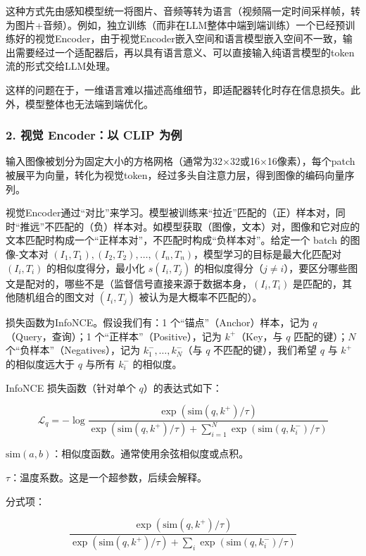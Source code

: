 这种方式先由感知模型统一将图片、音频等转为语言（视频隔一定时间采样帧，转为图片+音频）。例如，独立训练（而非在LLM整体中端到端训练）一个已经预训练好的视觉Encoder，由于视觉Encoder嵌入空间和语言模型嵌入空间不一致，输出需要经过一个适配器后，再以具有语言意义、可以直接输入纯语言模型的token流的形式交给LLM处理。

这样的问题在于，一维语言难以描述高维细节，即适配器转化时存在信息损失。此外，模型整体也无法端到端优化。

\hypertarget{ux89c6ux89c9-encoderux4ee5-clip-ux4e3aux4f8b}{%
\subsubsection{2. 视觉 Encoder：以 CLIP 为例}\label{ux89c6ux89c9-encoderux4ee5-clip-ux4e3aux4f8b}}

输入图像被划分为固定大小的方格网格（通常为32×32或16×16像素），每个patch被展平为向量，转化为视觉token，经过多头自注意力层，得到图像的编码向量序列。

视觉Encoder通过``对比''来学习。模型被训练来``拉近''匹配的（正）样本对，同时``推远''不匹配的（负）样本对。如模型获取（图像，文本）对，图像和它对应的文本匹配时构成一个``正样本对''，不匹配时构成``负样本对''。给定一个 batch 的图像-文本对 \((I_1,T_1),(I_2,T_2),\ldots,(I_n,T_n)\)，模型学习的目标是最大化匹配对 \((I_i,T_i)\) 的相似度得分，最小化 \(s(I_i,T_j)\) 的相似度得分（\(j\ne i\)），要区分哪些图文是配对的，哪些不是（监督信号直接来源于数据本身，\((I_i,T_i)\) 是匹配的，其他随机组合的图文对 \((I_i,T_j)\) 被认为是大概率不匹配的）。

损失函数为InfoNCE。假设我们有：1 个``锚点''（Anchor）样本，记为 \(q\)（Query，查询）；1 个``正样本''（Positive），记为 \(k^+\)（Key，与 \(q\) 匹配的键）；\(N\) 个``负样本''（Negatives），记为 \(k_1^-,\ldots,k_N^-\)（与 \(q\) 不匹配的键），我们希望 \(q\) 与 \(k^+\) 的相似度远大于 \(q\) 与所有 \(k_i^-\) 的相似度。

InfoNCE 损失函数（针对单个 \(q\)）的表达式如下：

\[
\mathcal{L}_q=-\log \frac{\exp(\mathrm{sim}(q,k^+)/\tau)}
{\exp(\mathrm{sim}(q,k^+)/\tau)+\sum_{i=1}^{N}\exp(\mathrm{sim}(q,k_i^-)/\tau)}
\]

\(\mathrm{sim}(a,b)\)：相似度函数。通常使用余弦相似度或点积。

\(\tau\)：温度系数。这是一个超参数，后续会解释。

分式项：

\[
\frac{\exp(\mathrm{sim}(q,k^+)/\tau)}
{\exp(\mathrm{sim}(q,k^+)/\tau)+\sum_i\exp(\mathrm{sim}(q,k_i^-)/\tau)}
\]

